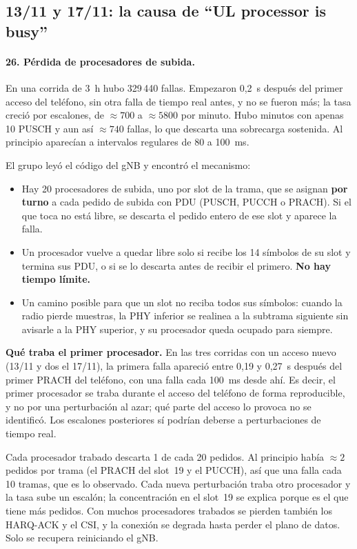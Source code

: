 \subsection{13/11 y 17/11: la causa de ``UL processor is busy''}
\paragraph{26. Pérdida de procesadores de subida.} En una corrida de 3~h hubo 329\,440 fallas. Empezaron 0,2~s después del primer acceso del teléfono, sin otra falla de tiempo real antes, y no se fueron más; la tasa creció por escalones, de $\approx 700$ a $\approx 5800$ por minuto. Hubo minutos con apenas 10 PUSCH y aun así $\approx 740$ fallas, lo que descarta una sobrecarga sostenida. Al principio aparecían a intervalos regulares de 80 a 100~ms.

El grupo leyó el código del gNB y encontró el mecanismo:
\begin{itemize}
  \item Hay 20 procesadores de subida, uno por slot de la trama, que se asignan \textbf{por turno} a cada pedido de subida con PDU (PUSCH, PUCCH o PRACH). Si el que toca no está libre, se descarta el pedido entero de ese slot y aparece la falla.
  \item Un procesador vuelve a quedar libre solo si recibe los 14 símbolos de su slot y termina sus PDU, o si se lo descarta antes de recibir el primero. \textbf{No hay tiempo límite.}
  \item Un camino posible para que un slot no reciba todos sus símbolos: cuando la radio pierde muestras, la PHY inferior se realinea a la subtrama siguiente sin avisarle a la PHY superior, y su procesador queda ocupado para siempre.
\end{itemize}
\textbf{Qué traba el primer procesador.} En las tres corridas con un acceso nuevo (13/11 y dos el 17/11), la primera falla apareció entre 0,19 y 0,27~s después del primer PRACH del teléfono, con una falla cada 100~ms desde ahí. Es decir, el primer procesador se traba durante el acceso del teléfono de forma reproducible, y no por una perturbación al azar; qué parte del acceso lo provoca no se identificó. Los escalones posteriores sí podrían deberse a perturbaciones de tiempo real.

Cada procesador trabado descarta 1 de cada 20 pedidos. Al principio había $\approx 2$ pedidos por trama (el PRACH del slot~19 y el PUCCH), así que una falla cada 10 tramas, que es lo observado. Cada nueva perturbación traba otro procesador y la tasa sube un escalón; la concentración en el slot~19 se explica porque es el que tiene más pedidos. Con muchos procesadores trabados se pierden también los HARQ-ACK y el CSI, y la conexión se degrada hasta perder el plano de datos. Solo se recupera reiniciando el gNB.

